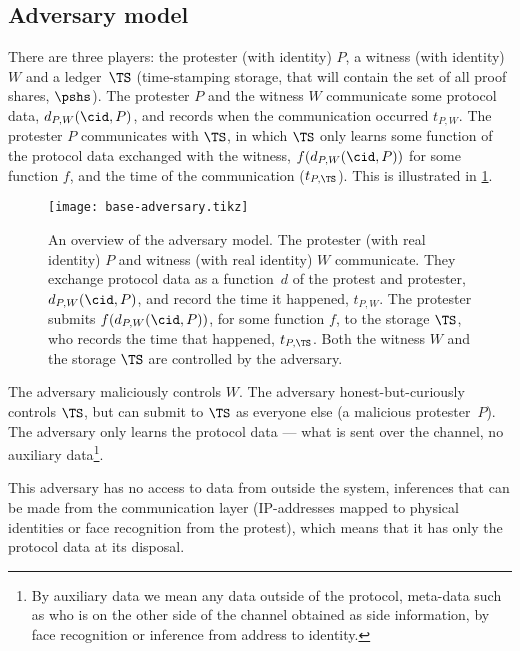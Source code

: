 \subsection{Adversary model}%
\label{formal-adversary-model}


There are three players: the protester (with identity) \(P\), a witness (with 
identity) \(W\) and a ledger~\(\TS\) (\ie time-stamping storage, that will 
contain the set of all proof shares, \(\pshs\)).
The protester \(P\) and the witness \(W\) communicate some protocol data,
\(d_{P,W}(\cid, P)\), and records when the communication occurred \(t_{P,W}\).
The protester \(P\) communicates with \(\TS\), in which \(\TS\) only learns 
some function of the protocol data exchanged with the witness, 
\(f(d_{P,W}(\cid, P))\) for some function \(f\), and the time of the 
communication (\(t_{P,\TS}\)).
This is illustrated in \cref{fig:base-adversary}.

\begin{figure}
  \centering
  \texttt{[image: base-adversary.tikz]}
  \caption{\label{fig:base-adversary}%
    An overview of the adversary model.
    The protester (with real identity) \(P\) and witness (with real identity) 
    \(W\) communicate.
    They exchange protocol data as a function~\(d\) of the protest and 
    protester, \(d_{P,W}(\cid, P)\), and record the time it happened, 
    \(t_{P,W}\).
    The protester submits \(f(d_{P,W}(\cid, P))\), for some function \(f\), to 
    the storage \(\TS\), who records the time that happened, \(t_{P,\TS}\).
    Both the witness \(W\) and the storage \(\TS\) are controlled by the 
    adversary.
  }
\end{figure}

The adversary maliciously controls \(W\).
The adversary honest-but-curiously controls \(\TS\), but can submit to \(\TS\) 
as everyone else (\ie a malicious protester~\(P\)).
The adversary only learns the protocol data --- \ie what is sent over the 
channel, no auxiliary data\footnote{%
  By auxiliary data we mean any data outside of the protocol, \ie
  meta-data such as who is on the other side of the channel obtained
  as side information, \eg by face recognition or inference from address
  to identity.
}.

This adversary has no access to data from outside the system, \eg inferences 
that can be made from the communication layer (\eg IP-addresses mapped to 
physical identities or face recognition from the protest), which means that it 
has only the protocol data at its disposal.

